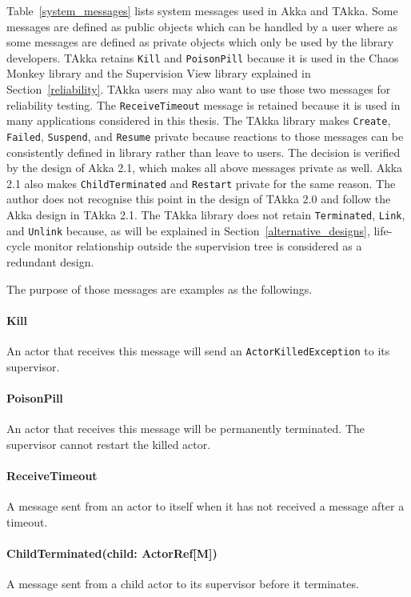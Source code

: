 Table~\ref{system_messages} lists system messages used in Akka and TAkka.
Some messages are defined as public objects which can be handled by a user where
as some messages are defined as private objects which only be used by the
library developers.  TAkka retains {\tt Kill} and {\tt PoisonPill} because it is used
in the Chaos Monkey library and the Supervision View 
library explained in Section~\ref{reliability}.  TAkka users may also want to use those two messages for
reliability testing.  The {\tt ReceiveTimeout} message is retained because it is used in many 
applications considered in this thesis.  The TAkka library makes {\tt Create}, {\tt Failed}, {\tt Suspend}, 
and {\tt Resume} private because reactions to those messages can be consistently defined
in library rather than leave to users.  The decision is verified by the design
of Akka 2.1, which makes all above messages private as well.  Akka 2.1 also makes
{\tt ChildTerminated} and {\tt Restart} private for the same reason.  The author
does not recognise this point in the design of TAkka 2.0 and follow the Akka design
in TAkka 2.1.  The TAkka library does not retain {\tt Terminated}, {\tt Link}, and {\tt Unlink} because, as will be explained in 
Section~\ref{alternative_designs}, life-cycle monitor relationship outside the 
supervision tree is considered as a redundant design.

The purpose of those messages are examples as the followings.

\paragraph{Kill}   An actor that receives this message will send an {\tt ActorKilledException} 
to its supervisor.

\paragraph{PoisonPill}  An actor that receives this message will be permanently terminated.  The
supervisor cannot restart the killed actor.

\paragraph{ReceiveTimeout}  A message sent from an actor to itself when it has not received a message
after a timeout.

\paragraph{ChildTerminated(child: ActorRef[M])}  A message sent from a child actor to its supervisor before it terminates.
  

